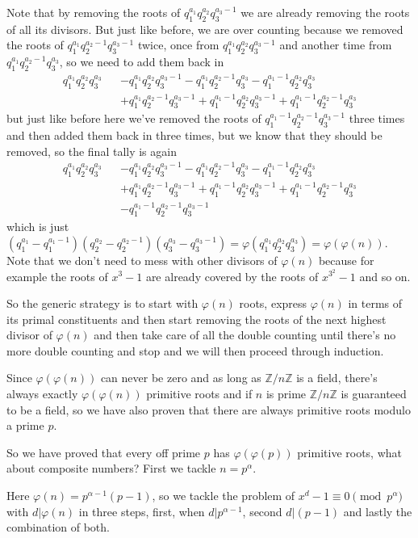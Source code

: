 \documentclass[aps,preprint,preprintnumbers,nofootinbib,showpacs,prd]{revtex4-1}
\newcommand{\nbea}{\begin{eqnarray*}}
\newcommand{\neea}{\end{eqnarray*}}
\begin{document}
Note that by removing the roots of $q_1^{a_1}q_2^{a_2}q_3^{a_3-1}$ we are already removing the roots of all its divisors. But just like before, we are over counting because we removed the roots of $q_1^{a_1}q_2^{a_2-1}q_3^{a_3-1}$ twice, once from $q_1^{a_1}q_2^{a_2}q_3^{a_3-1}$ and another time from $q_1^{a_1}q_2^{a_2-1}q_3^{a_3}$, so we need to add them back in
%
\nbea
q_1^{a_1}q_2^{a_2}q_3^{a_3} &&  - q_1^{a_1}q_2^{a_2}q_3^{a_3-1} - q_1^{a_1}q_2^{a_2-1}q_3^{a_3}- q_1^{a_1-1}q_2^{a_2}q_3^{a_3} \\
&& + q_1^{a_1}q_2^{a_2-1}q_3^{a_3-1} + q_1^{a_1-1}q_2^{a_2}q_3^{a_3-1} + q_1^{a_1-1}q_2^{a_2-1}q_3^{a_3}
\neea
%
but just like before here we've removed the roots of $q_1^{a_1-1}q_2^{a_2-1}q_3^{a_3-1}$ three times and then added them back in three times, but we know that they should be removed, so the final tally is again
%
\nbea
q_1^{a_1}q_2^{a_2}q_3^{a_3} &&  - q_1^{a_1}q_2^{a_2}q_3^{a_3-1} - q_1^{a_1}q_2^{a_2-1}q_3^{a_3}- q_1^{a_1-1}q_2^{a_2}q_3^{a_3} \\
&& + q_1^{a_1}q_2^{a_2-1}q_3^{a_3-1} + q_1^{a_1-1}q_2^{a_2}q_3^{a_3-1} + q_1^{a_1-1}q_2^{a_2-1}q_3^{a_3} \\
&& -q_1^{a_1-1}q_2^{a_2-1}q_3^{a_3-1}
\neea
%
which is just $(q_1^{a_1} - q_1^{a_1-1})(q_2^{a_2}-q_2^{a_2-1})(q_3^{a_3} - q_3^{a_3-1}) =\varphi(q_1^{a_1}q_2^{a_2}q_3^{a_3}) = \varphi(\varphi(n))$. Note that we don't need to mess with other divisors of $\varphi(n)$ because for example the roots of $x^3 - 1$ are already covered by the roots of $x^{3^2} - 1$ and so on.

So the generic strategy is to start with $\varphi(n)$ roots, express $\varphi(n)$ in terms of its primal constituents and then start removing the roots of the next highest divisor of $\varphi(n)$ and then take care of all the double counting until there's no more double counting and stop and we will then proceed through induction.

Since $\varphi(\varphi(n))$ can never be zero and as long as $\mathbb{Z}/n\mathbb{Z}$ is a field, there's always exactly $\varphi(\varphi(n))$ primitive roots and if $n$ is prime $\mathbb{Z}/n\mathbb{Z}$ is guaranteed to be a field, so we have also proven that there are always primitive roots modulo a prime $p$.

So we have proved that every off prime $p$ has $\varphi(\varphi(p))$ primitive roots, what about composite numbers? First we tackle $n = p^\alpha$.

Here $\varphi(n) = p^{\alpha-1}(p-1)$, so we tackle the problem of $x^d - 1\equiv 0 \pmod{p^\alpha}$ with $d|\varphi(n)$ in three steps, first, when $d|p^{\alpha-1}$, second $d|(p-1)$ and lastly the combination of both.
\end{document}
